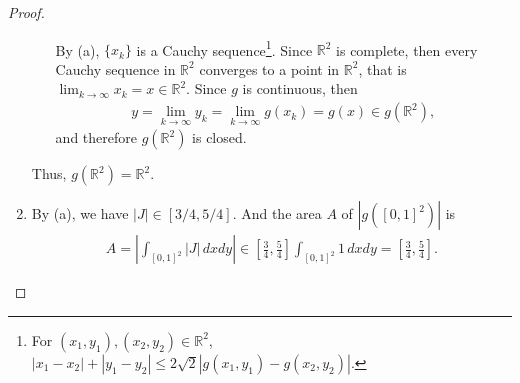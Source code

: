 \documentclass[11pt]{article}
\theoremstyle{definition}
\numberwithin{equation}{subsection}
\begin{document}
\begin{proof}
\begin{enumerate}[label=(\alph*)]
\begin{enumerate}[label=\arabic*)]
        By (a), $\{x_k\}$ is a Cauchy sequence\footnote{For $(x_1, y_1), (x_2, y_2) \in \mathbb{R}^2$, $\left|x_1 - x_2\right| + \left|y_1 - y_2\right| \leq 2\sqrt{2} \left|g(x_1, y_1) - g(x_2, y_2)\right|$.}. Since $\mathbb{R}^2$ is complete, then every Cauchy sequence in $\mathbb{R}^2$ converges to a point in $\mathbb{R}^2$, that is $\lim_{k\to\infty} x_k = x \in \mathbb{R}^2$. Since $g$ is continuous, then 
        \begin{align*}
            y = \lim_{k\to\infty} y_k = \lim_{k\to\infty} g(x_k) = g(x) \in g(\mathbb{R}^2),
        \end{align*}
        and therefore $g(\mathbb{R}^2)$ is closed.
    \end{enumerate}
    Thus, $g(\mathbb{R}^2) = \mathbb{R}^2$.
    
    \item By (a), we have $|J| \in [3/4, 5/4]$. And the area $A$ of $\left| g([0,1]^2) \right|$ is
    \begin{align*}
        A = \left|\int_{[0,1]^2} |J|\, dx dy \right| \in \left[ \frac{3}{4}, \frac{5}{4} \right] \int_{[0,1]^2} 1 \, dx dy = \left[ \frac{3}{4}, \frac{5}{4} \right].
    \end{align*}
\end{enumerate}
\end{proof}









\newpage


\end{document}
